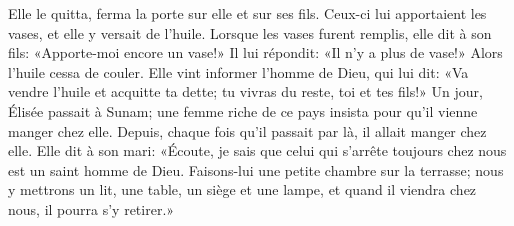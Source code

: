 Elle le quitta, ferma la porte sur elle et sur ses fils.
	Ceux-ci lui apportaient les vases, et elle y versait de l’huile.
Lorsque les vases furent remplis, elle dit à son fils:
	«Apporte-moi encore un vase!»
	Il lui répondit: «Il n’y a plus de vase!»
	Alors l’huile cessa de couler.
Elle vint informer l’homme de Dieu, qui lui dit:
	«Va vendre l’huile et acquitte ta dette; tu vivras du reste, toi et tes fils!»
Un jour, Élisée passait à Sunam;
	une femme riche de ce pays insista pour qu’il vienne manger chez elle.
	Depuis, chaque fois qu’il passait par là, il allait manger chez elle.
Elle dit à son mari: «Écoute,
	je sais que celui qui s’arrête toujours chez nous est un saint homme de Dieu.
Faisons-lui une petite chambre sur la terrasse;
	nous y mettrons un lit, une table, un siège et une lampe,
	et quand il viendra chez nous, il pourra s’y retirer.»
